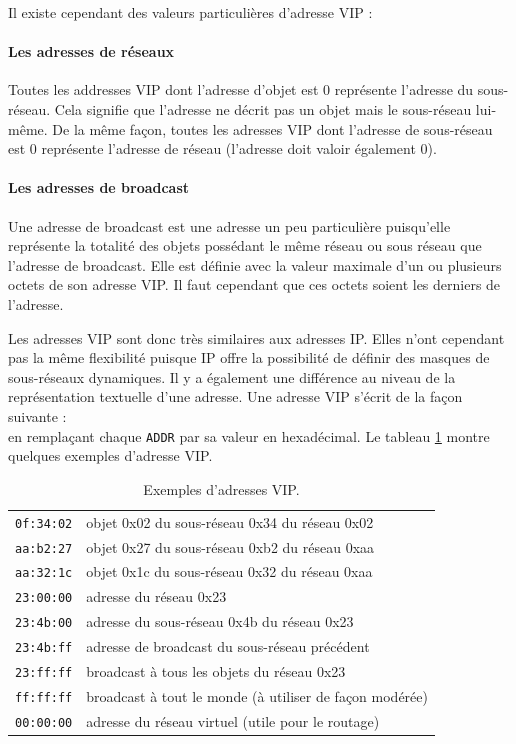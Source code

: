 			Il existe cependant des valeurs particulières d'adresse VIP : 
			\paragraph{Les adresses de réseaux}
				Toutes les addresses VIP dont l'adresse d'objet est 0 représente l'adresse du 
				sous-réseau. Cela signifie que l'adresse ne décrit pas un objet mais le sous-réseau 
				lui-même. De la même façon, toutes les adresses VIP dont l'adresse de sous-réseau est 0 
				représente 	l'adresse de réseau (l'adresse doit valoir également 0).
				
			\paragraph{Les adresses de broadcast}
				Une adresse de broadcast est une adresse un peu particulière puisqu'elle représente la
				totalité des objets possédant le même réseau ou sous réseau que l'adresse de broadcast.
				Elle est définie avec la valeur maximale d'un ou plusieurs octets de son adresse VIP.
				Il faut cependant que ces octets soient les derniers de l'adresse.
				
			Les adresses VIP sont donc très similaires aux adresses IP. Elles n'ont cependant pas la
			même flexibilité puisque IP offre la possibilité de définir des masques de sous-réseaux
			dynamiques. Il y a également une différence au niveau de la représentation textuelle d'une
			adresse. Une adresse VIP s'écrit de la façon suivante : \\
			en remplaçant chaque \texttt{ADDR} par sa valeur en hexadécimal. 
			Le tableau \ref{vipExample} montre quelques exemples d'adresse VIP.

			\begin{table}[!ht]
				\centering
				\begin{tabular}{ll}
					\texttt{0f:34:02} & objet 0x02 du sous-réseau 0x34 du réseau 0x02 \\
					\texttt{aa:b2:27} & objet 0x27 du sous-réseau 0xb2 du réseau 0xaa \\
					\texttt{aa:32:1c} & objet 0x1c du sous-réseau 0x32 du réseau 0xaa \\
					\texttt{23:00:00}	& adresse du réseau 0x23	\\
					\texttt{23:4b:00}	& adresse du sous-réseau 0x4b du réseau 0x23 \\
					\texttt{23:4b:ff}	& adresse de broadcast du sous-réseau précédent \\
					\texttt{23:ff:ff}	& broadcast à tous les objets du réseau 0x23 \\
					\texttt{ff:ff:ff}	& broadcast à tout le monde (à utiliser de façon modérée) \\
					\texttt{00:00:00}	& adresse du réseau virtuel (utile pour le routage) \\
				\end{tabular}
				\caption{Exemples d'adresses VIP.}
				\label{vipExample}
			\end{table}


